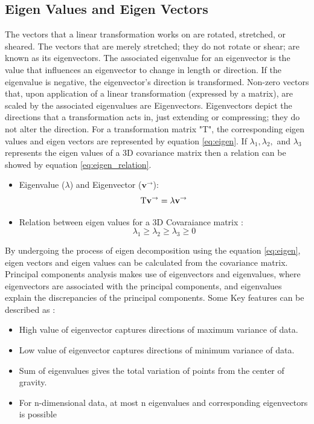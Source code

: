 \subsection{Eigen Values and Eigen Vectors}
 The vectors that a linear transformation works on are rotated, stretched, or sheared. The vectors that are merely stretched; they do not rotate or shear; are known as its eigenvectors. The associated eigenvalue for an eigenvector is the value that influences an eigenvector to change in length or direction. If the eigenvalue is negative, the eigenvector's direction is transformed. Non-zero vectors that, upon application of a linear transformation (expressed by a matrix), are scaled by the associated eigenvalues are Eigenvectors. Eigenvectors depict the directions that a transformation acts in, just extending or compressing; they do not alter the direction. For a transformation matrix "T", the corresponding eigen values and eigen vectors are represented by equation \ref{eq:eigen}. If \( \lambda_1, \lambda_2, \) and \( \lambda_3 \) represents the eigen values of a 3D covariance matrix then a relation can be showed by equation \ref{eq:eigen_relation}.

\begin{itemize}
    \item Eigenvalue (\( \lambda \)) and Eigenvector (\( \mathbf{v}^{\rightarrow} \)):
    \begin{equation}\label{eq:eigen}
    \text T \mathbf{v}^{\rightarrow} = \lambda \mathbf{v}^{\rightarrow}
    \end{equation}
    \item Relation between eigen values for a 3D Covaraiance matrix :
    \begin{equation}\label{eq:eigen_relation}
    \lambda_1 \geq \lambda_2 \geq \lambda_3 \geq 0
    \end{equation}
    
\end{itemize}

By undergoing the process of eigen decomposition using the equation \ref{eq:eigen}, eigen vectors and eigen values can be calculated from the covariance matrix. Principal components analysis makes use of eigenvectors and eigenvalues, where eigenvectors are associated with the principal components, and eigenvalues explain the discrepancies of the principal components. Some Key features can be described as :
\begin{itemize}
    \item High value of eigenvector captures directions of maximum variance of data.
    \item Low value of eigenvector captures directions of minimum variance of data.
    \item Sum of eigenvalues gives the total variation of points from the center of gravity.
    \item For n-dimensional data, at most n eigenvalues and corresponding eigenvectors is possible
\end{itemize}

